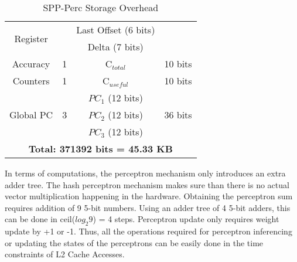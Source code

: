 \begin{table}[h]
\begin{adjustwidth}{-0.5cm}{}
\begin{tabular}{|c|c|c|c|}
        \multirow{2}{1.2cm}{Register}               &                        & Last Offset (6 bits) &                               \\
                                                    &                        & Delta (7 bits)       &                               \\
    \hline
        Accuracy        & 1     & C$_{total}$       & 10 bits   \\
        Counters        & 1     & C$_{useful}$      & 10 bits   \\
    \hline
        \multirow{3}{1.5cm}{Global PC\newline}      &       & $PC_1$ (12 bits)      &           \\
        \multirow{2}{1.5cm}{~Trackers}              & 3     & $PC_2$ (12 bits)      & 36 bits   \\
                                                    &       & $PC_3$ (12 bits)      &           \\
    \hline
        \multicolumn{4}{|c|}{\textbf{Total: 371392 bits = 45.33 KB}}\\
    \hline
    \end{tabular}
    \caption{SPP-Perc Storage Overhead}
    \label{tab:PPF_overhead}
\end{adjustwidth}
\end{table}



In terms of computations, the perceptron mechanism only introduces an
extra adder tree.  The hash perceptron mechanism makes sure than there
is no actual vector multiplication happening in the hardware.
Obtaining the perceptron sum requires addition of 9 5-bit numbers.
Using an adder tree of 4 5-bit adders, this can be done in
ceil($log_{2}9$) = 4 steps.  Perceptron update only requires weight
update by +1 or -1.  Thus, all the operations required for perceptron
inferencing or updating the states of the perceptrons can be
easily done in the time constraints of L2 Cache Accesses.

